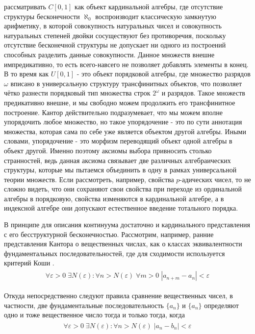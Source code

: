 \documentclass[12pt]{article}
\begin{document}
рассматривать $C[0, 1]$ как объект кардинальной алгебры, где отсутствие структуры бесконечности $\aleph_0$ воспроизводит классическую замкнутую арифметику, в которой совокупность натуральных чисел и совокупность натуральных степеней двойки сосуществуют без противоречия, поскольку отсутствие бесконечной структуры не допускает ни одного из построений способных разделить данные совокупности. Данное множеств внешне импредикативно, то есть всего-навсего не позволяет добавлять элементы в конец. В то время как $U[0, 1]$ - это объект порядковой алгебры, где множество разрядов $\omega$ вписано в универсальную структуру трансфинитных объектов, что позволяет чётко разнести порядковый тип множества строк $2^{\omega}$ и разрядов. Такое множеств предикативно внешне, и мы свободно можем продолжить его трансфинитное построение. Кантор действительно подразумевает, что мы можем вполне упорядочить любое множество, но такое упорядочение - это по сути аннотация множества, которая сама по себе уже является объектом другой алгебры. Иными словами, упорядочение - это морфизм переводящий объект одной алгебры в объект другой. Именно поэтому аксиомы выбора привносить столько странностей, ведь данная аксиома связывает две различных алгебраических структуры, которые мы пытаемся объединить в одну в рамках универсальной теории множеств. Если рассмотреть, например, свойства $p$-адических чисел, то не сложно видеть, что они сохраняют свои свойства при переходе из ординальной алгебры в порядковую, свойства изменяются в кардинальной алгебре, а в индексной алгебре они допускают естественное введение тотального порядка.

В принципе для описания континуума достаточно и кардинального представления с его бесструктурной бесконечностью. Рассмотрим, например, ранние представления Кантора о вещественных числах, как о классах эквивалентности фундаментальных последовательностей, где для сходимости используется критерий Коши \cite{cantor-real}.
\begin{align}
\begin{split}
\forall \varepsilon > 0 \; \exists N(\varepsilon): \forall n > N(\varepsilon) \; \forall m > 0 \; |a_{n+m} - a_n| < \varepsilon
\end{split}
\end{align}

Откуда непосредственно следуют правила сравнение вещественных чисел, в частности, две фундаментальные последовательность $\{a_n\}$ и $\{a_n\}$ определяют одно и тоже вещественное число тогда и только тогда, когда
\begin{align}
\begin{split}
\forall \varepsilon > 0 \; \exists N(\varepsilon): \forall n > N(\varepsilon) \; |a_n - b_n| < \varepsilon
\end{split}
\end{align}
\end{document}
